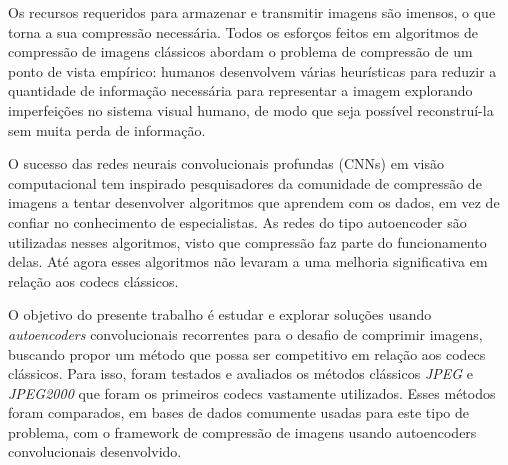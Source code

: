 Os recursos requeridos para armazenar e transmitir imagens são imensos, o que torna a sua compressão necessária. Todos os esforços feitos em algoritmos de compressão de imagens clássicos abordam o problema de compressão de um ponto de vista empírico: humanos desenvolvem várias heurísticas para reduzir a quantidade de informação necessária para representar a imagem explorando imperfeições no sistema visual humano, de modo que seja possível reconstruí-la sem muita perda de informação. 

O sucesso das redes neurais convolucionais profundas (CNNs) em visão computacional tem inspirado pesquisadores da comunidade de compressão de imagens a tentar desenvolver algoritmos que aprendem com os dados, em vez de confiar no conhecimento de especialistas. As redes do tipo autoencoder são utilizadas nesses algoritmos, visto que compressão faz parte do funcionamento delas. Até agora esses algoritmos não levaram a uma melhoria significativa em relação aos codecs clássicos.

O objetivo do presente trabalho é estudar e explorar soluções usando \textit{autoencoders} convolucionais recorrentes para o desafio de comprimir imagens, buscando propor um método que possa ser competitivo em relação aos codecs clássicos. Para isso, foram testados e avaliados os métodos clássicos \textit{JPEG} e \textit{JPEG2000} que foram os primeiros codecs vastamente utilizados. Esses métodos foram comparados, em bases de dados comumente usadas para este tipo de problema, com o framework de compressão de imagens usando autoencoders convolucionais desenvolvido.


